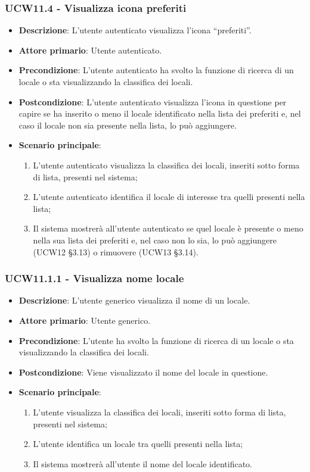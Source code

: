 \subsubsection{UCW11.4 - Visualizza icona preferiti}
\begin{itemize}
    \item \textbf{Descrizione}: L'utente autenticato visualizza l'icona “preferiti”.
    \item \textbf{Attore primario}: Utente autenticato.
    \item \textbf{Precondizione}: L'utente autenticato ha svolto la funzione di ricerca di un locale o sta visualizzando la classifica dei locali.
    \item \textbf{Postcondizione}: L'utente autenticato visualizza l'icona in questione per capire se ha inserito o meno il locale identificato nella lista dei preferiti e, nel caso il locale non sia presente nella lista, lo può aggiungere.
    \item \textbf{Scenario principale}: 
    \begin{enumerate}
    \item L'utente autenticato visualizza la classifica dei locali, inseriti sotto forma di lista, presenti nel sistema;
    \item L'utente autenticato identifica il locale di interesse tra quelli presenti nella lista;
    \item Il sistema mostrerà all'utente autenticato se quel locale è presente o meno nella sua lista dei preferiti e, nel caso non lo sia, lo può aggiungere (UCW12 \S{}3.13) o rimuovere (UCW13 \S{}3.14).
    \end{enumerate}
\end{itemize}

\subsubsection{UCW11.1.1 - Visualizza nome locale}
\begin{itemize}
    \item \textbf{Descrizione}: L'utente generico visualizza il nome di un locale.
    \item \textbf{Attore primario}: Utente generico.
    \item \textbf{Precondizione}: L'utente ha svolto la funzione di ricerca di un locale o sta visualizzando la classifica dei locali.
    \item \textbf{Postcondizione}: Viene visualizzato il nome del locale in questione.
    \item \textbf{Scenario principale}: 
    \begin{enumerate}
	\item L'utente visualizza la classifica dei locali, inseriti sotto forma di lista, presenti nel sistema;
    \item L'utente identifica un locale tra quelli presenti nella lista;
	\item Il sistema mostrerà all'utente il nome del locale identificato.
    \end{enumerate}
\end{itemize}

